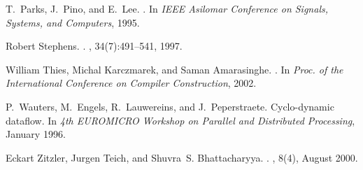 \documentclass{sig-alt-full}
\begin{document}
{\begin{thebibliography}{10}
T.~Parks, J.~Pino, and E.~Lee.
.
\newblock In {\em IEEE Asilomar Conference on Signals, Systems, and Computers},
  1995.

Robert Stephens.
.
, 34(7):491--541, 1997.

William Thies, Michal Karczmarek, and Saman Amarasinghe.
.
\newblock In {\em {Proc. of the International Conference on Compiler
  Construction}}, 2002.

P.~Wauters, M.~Engels, R.~Lauwereins, and J.~Peperstraete.
\newblock Cyclo-dynamic dataflow.
\newblock In {\em 4th EUROMICRO Workshop on Parallel and Distributed
  Processing}, January 1996.

Eckart Zitzler, Jurgen Teich, and Shuvra~S. Bhattacharyya.
.
,
  8(4), August 2000.

\end{thebibliography}
}
%

%
\end{document}
